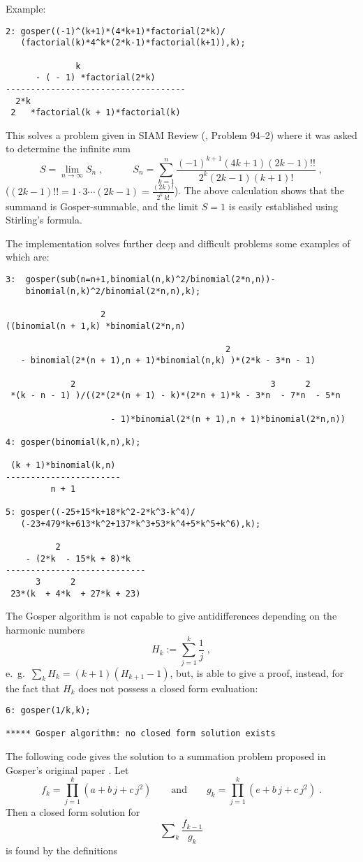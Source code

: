 Example:

{\small
\begin{verbatim}
2: gosper((-1)^(k+1)*(4*k+1)*factorial(2*k)/
   (factorial(k)*4^k*(2*k-1)*factorial(k+1)),k);

              k
      - ( - 1) *factorial(2*k)
------------------------------------
  2*k
 2   *factorial(k + 1)*factorial(k)
\end{verbatim}
}\noindent
This solves a problem given in SIAM Review (\cite{SR}, Problem 94--2) 
where it was asked to determine the infinite sum
\[
S=\lim_{n\rightarrow\infty} S_n
\;,
\quad\quad\quad
S_n=\sum_{k=1}^n
\frac{(-1)^{k+1}(4k+1)(2k-1)!!}{2^k(2k-1)(k+1)!}
\;,
\]
($(2k-1)!!=1\cdot 3 \cdots (2k-1)=\frac{(2k)!}{2^k\,k!}$).
The above calculation shows that the summand is Gosper-summable,
and the limit $S=1$ is easily established using Stirling's formula.

The implementation solves further deep and difficult problems some examples of
which are:%

{\small
\begin{verbatim}
3:  gosper(sub(n=n+1,binomial(n,k)^2/binomial(2*n,n))-
    binomial(n,k)^2/binomial(2*n,n),k);

                   2
((binomial(n + 1,k) *binomial(2*n,n)

                                            2
   - binomial(2*(n + 1),n + 1)*binomial(n,k) )*(2*k - 3*n - 1)

             2                                       3      2
 *(k - n - 1) )/((2*(2*(n + 1) - k)*(2*n + 1)*k - 3*n  - 7*n  - 5*n

                     - 1)*binomial(2*(n + 1),n + 1)*binomial(2*n,n))

4: gosper(binomial(k,n),k);

 (k + 1)*binomial(k,n)
-----------------------
         n + 1

5: gosper((-25+15*k+18*k^2-2*k^3-k^4)/
   (-23+479*k+613*k^2+137*k^3+53*k^4+5*k^5+k^6),k);

          2
    - (2*k  - 15*k + 8)*k
----------------------------
      3      2
 23*(k  + 4*k  + 27*k + 23)
\end{verbatim}
}\noindent
The Gosper algorithm is not capable to give antidifferences depending
on the harmonic numbers
\[
H_k:=\sum_{j=1}^k\frac{1}{j}
\;,
\]
e.\ g.\ $\sum_k H_k=(k+1)(H_{k+1}-1)$, but, is able to give a proof, instead,
for the fact that $H_k$ does not possess a closed form evaluation:

{\small
\begin{verbatim}
6: gosper(1/k,k);

***** Gosper algorithm: no closed form solution exists
\end{verbatim}
}\noindent
The following code gives the solution to a summation problem proposed in 
Gosper's original paper \cite{Gos}. Let
\[
f_k=\prod_{j=1}^k (a+b\,j+c\,j^2)
\quad\quad\mbox{and}\quad\quad
g_k=\prod_{j=1}^k (e+b\,j+c\,j^2)
\;.
\]
Then a closed form solution for
\[
\sum\nolimits_k\frac{f_{k-1}}{g_{k}}
\]
is found by the definitions

